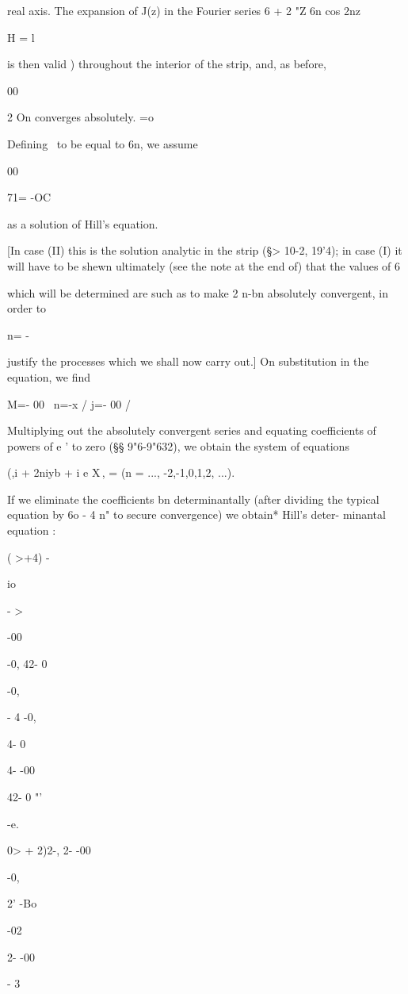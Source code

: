 real axis. The expansion of J(z) in the Fourier series 6 + 2 "Z 6n cos
2nz

H = l

is then valid ) throughout the interior of the strip, and, as
before,

00

2 On converges absolutely. =o

Defining \ to be equal to 6n, we assume

00

71= -OC 

as a solution of Hill's equation.

[In case (II) this is the solution analytic in the strip (§> 10-2,
19'4); in case (I) it will have to be shewn ultimately (see the note
at the end of) that the values of 6

which will be determined are such as to make 2 n-bn absolutely
convergent, in order to

n= -

justify the processes which we shall now carry out.] On substitution
in the equation, we find

M=- 00 \ n=-x / j=- 00 /

Multiplying out the absolutely convergent series and equating
coefficients of powers of e ' to zero (§§ 9"6-9"632), we obtain the
system of equations

(,i + 2niyb + i e X\,, = (n = ..., -2,-1,0,1,2, ...).

%
%

If we eliminate the coefficients bn determinantally (after dividing
the typical equation by 6o - 4 n" to secure convergence) we obtain*
Hill's deter- minantal equation :

( >+4) -

io

- >

-00

-0, 42- 0

-0,

- 4 -0,

4- 0

4- -00

42- 0 "'

-e.

0> + 2)2-, 2- -00

-0,

 2' -Bo

-02

2- -00

- 3

